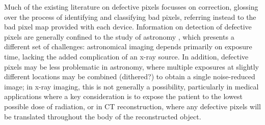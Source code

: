 \documentclass[../../IO-Pixels.tex]{subfiles}
\begin{document}
Much of the existing literature on defective pixels focusses on correction, glossing over the process of identifying and classifying bad pixels, referring instead to the bad pixel map provided with each device.  Information on detection of defective pixels are generally confined to the study of astronomy , which presents a different set of challenges: astronomical imaging depends primarily on exposure time, lacking the added complication of an x-ray source. In addition, defective pixels may be less problematic in astronomy, where multiple exposures at slightly different locations may be combined (dithered?) to obtain a single noise-reduced image; in x-ray imaging, this is not generally a possibility, particularly in medical applications where a key consideration is to expose the patient to the lowest possible dose of radiation, or in CT reconstruction, where any defective pixels will be translated throughout the body of the reconstructed object.
\end{document}
